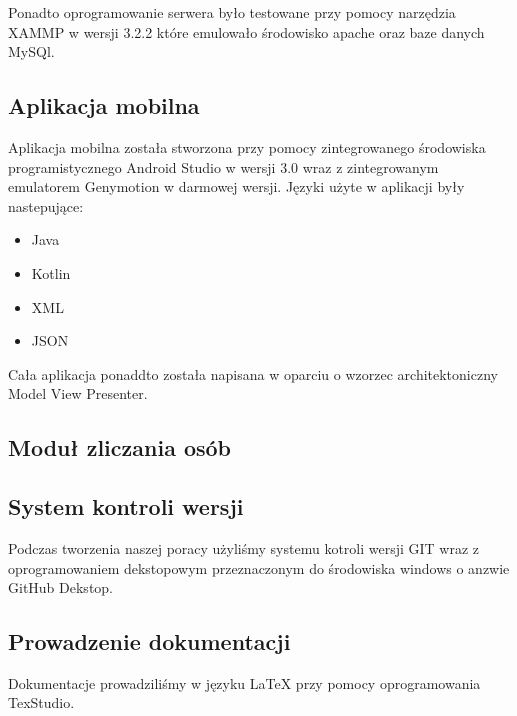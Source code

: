 Ponadto oprogramowanie serwera było testowane przy pomocy narzędzia XAMMP w wersji 3.2.2 które emulowało środowisko apache oraz baze danych MySQl.

\newpage
\subsection{Aplikacja mobilna}
Aplikacja mobilna została stworzona przy pomocy zintegrowanego środowiska programistycznego Android Studio w wersji 3.0 wraz z zintegrowanym emulatorem Genymotion w darmowej wersji. Języki użyte w aplikacji były nastepujące:
\begin{itemize}
	\item Java 
	\item Kotlin
	\item XML
	\item JSON
\end{itemize}
Cała aplikacja ponaddto została napisana w oparciu o wzorzec architektoniczny Model View Presenter. 

\newpage
\subsection{Moduł zliczania osób}

\newpage
\subsection{System kontroli wersji}
Podczas tworzenia naszej poracy użyliśmy systemu kotroli wersji GIT wraz z  oprogramowaniem dekstopowym przeznaczonym do środowiska windows o anzwie GitHub Dekstop.

\newpage
\subsection{Prowadzenie dokumentacji}
 Dokumentacje prowadziliśmy w języku LaTeX przy pomocy oprogramowania TexStudio. 
